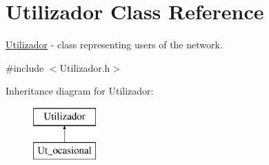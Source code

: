 \hypertarget{class_utilizador}{\section{Utilizador Class Reference}
\label{class_utilizador}
}


\hyperlink{class_utilizador}{Utilizador} -\/ class representing users of the network.  




{\ttfamily \#include $<$Utilizador.\+h$>$}

Inheritance diagram for Utilizador\+:\begin{figure}[H]
\begin{center}
\leavevmode
\includegraphics[height=2.000000cm]{class_utilizador}
\end{center}
\end{figure}

